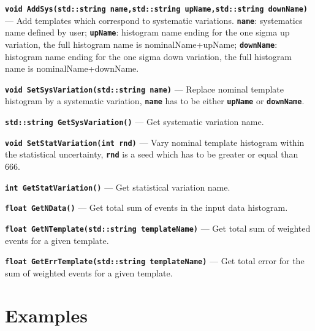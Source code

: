 \documentclass[12pt]{article}
\newcommand\verbbf[1]{\textcolor[rgb]{0,0,1}{\texttt{\textbf{#1}}}}
\newcommand\verbbfb[1]{\textcolor[rgb]{0,0,0}{\texttt{\textbf{#1}}}}
\begin{document}
\vspace{0.3cm}

\noindent \verbbf{void AddSys(std::string name,std::string upName,std::string downName)} ---
Add templates which correspond to systematic variations.
\verbbfb{name}: systematics name defined by user;
\verbbfb{upName}: histogram name ending for the one sigma up variation, the full
histogram name is nominalName+upName;
\verbbfb{downName}: histogram name ending for
the one sigma down variation, the full histogram name is
nominalName+downName.

\vspace{0.3cm} 

\noindent \verbbf{void SetSysVariation(std::string name)} --- Replace
nominal template histogram by a systematic variation, \verbbfb{name}
has to be either \verbbfb{upName} or \verbbfb{downName}.

\vspace{0.3cm}

\noindent \verbbf{std::string GetSysVariation()} ---
Get systematic variation name.

\vspace{0.3cm}

\noindent \verbbf{void SetStatVariation(int rnd)} ---
Vary nominal template histogram within the statistical uncertainty,
\verbbfb{rnd} is a seed which has to be greater or equal than 666.

\vspace{0.3cm}

\noindent \verbbf{int GetStatVariation()} ---
Get statistical variation name.

\vspace{0.3cm}

\noindent \verbbf{float GetNData()} ---
Get total sum of events in the input data histogram.

\vspace{0.3cm}

\noindent \verbbf{float GetNTemplate(std::string templateName)} ---
Get total sum of weighted events for a given template.

\vspace{0.3cm}

\noindent \verbbf{float GetErrTemplate(std::string templateName)} ---
Get total error for the sum of weighted events for a given template.

\section{Examples}
\end{document}
